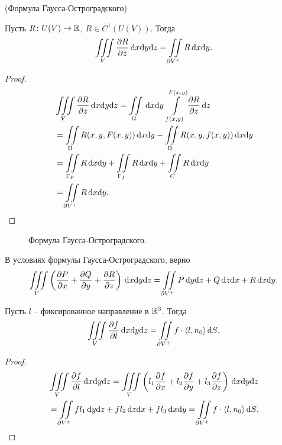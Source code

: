 \begin{theorem}(Формула Гаусса-Остроградского)

    Пусть $R \colon U(V) \to \mathbb{R}$, $R \in C^1(U(V))$. Тогда
\[
    \iiint\limits_{V}{\dfrac{\partial R}{\partial z} \,\mathrm{d} x \mathrm{d} y \mathrm{d} z} = \iint\limits_{\partial V^+}{R \,\mathrm{d} x \mathrm{d} y}
.\] 
\end{theorem}
\begin{proof}
    \begin{align*}
        &\iiint\limits_{V}{\dfrac{\partial R}{\partial z} \,\mathrm{d} x \mathrm{d} y \mathrm{d} z} = \iint\limits_{\Omega}{\,\mathrm{d} x \mathrm{d} y~
        {\int\limits_{f(x, y)}^{F(x, y)}{\dfrac{\partial R}{\partial z} \,\mathrm{d} z}}} \\
        &= \iint\limits_{\Omega}{R(x, y, F(x, y)) \,\mathrm{d} x \mathrm{d} y} - \iint\limits_{\Omega}{R(x, y, f(x, y)) \,\mathrm{d} x \mathrm{d} y} \\
        &= \iint\limits_{\Gamma_F}{R \,\mathrm{d} x \mathrm{d} y} + \iint\limits_{\Gamma_f}{R \,\mathrm{d} x \mathrm{d} y} + \iint\limits_{C}{R \,\mathrm{d} x \mathrm{d} y} \\
        &= \iint\limits_{\partial V^+}{R \,\mathrm{d} x \mathrm{d} y}
    .\end{align*}
\end{proof}

\begin{figure}[h!]
    \centering
    \caption{Формула Гаусса-Остроградского.}
\end{figure}

\begin{corollary}
    В условиях формулы Гаусса-Остроградского, верно
\[
    \iiint\limits_{V}{\left(\dfrac{\partial P}{\partial x} + \dfrac{\partial Q}{\partial y} + \dfrac{\partial R}{\partial z}\right) \,\mathrm{d} x \mathrm{d} y \mathrm{d} z} =
    \iint\limits_{\partial V^+}{P \,\mathrm{d} y \mathrm{d} z + Q \,\mathrm{d} z \mathrm{d} x + R \,\mathrm{d} x \mathrm{d} y}
.\]
\end{corollary}

\begin{corollary}
    Пусть $l$ -- фиксированное направление в $\mathbb{R}^3$. Тогда
\[
    \iiint\limits_{V}{\dfrac{\partial f}{\partial l} \,\mathrm{d} x \mathrm{d} y \mathrm{d} z} = 
    \iint\limits_{\partial V^+}{f \cdot \langle l, n_0 \rangle \,\mathrm{d} S}
.\] 
\end{corollary}
\begin{proof}
    \begin{align*}
        &\iiint\limits_V{\dfrac{\partial f}{\partial l} \,\mathrm{d} x \mathrm{d} y \mathrm{d} z} =
        \iiint\limits_V{\left( l_1 \dfrac{\partial f}{\partial x} + l_2 \dfrac{\partial f}{\partial y} + l_3 \dfrac{\partial f}{\partial z} \right) \,\mathrm{d} x \mathrm{d} y \mathrm{d} z} \\
        &= \iint\limits_{\partial V^+}{f l_1 \,\mathrm{d} y \mathrm{d} z + f l_2 \,\mathrm{d} z \mathrm{d} x + f l_3 \,\mathrm{d} x \mathrm{d} y}
        = \iint\limits_{\partial V^+}{f \cdot \langle l, n_0 \rangle \,\mathrm{d} S}
    .\end{align*}
\end{proof}

